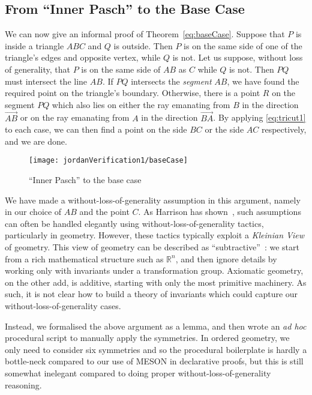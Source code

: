 \subsection{From ``Inner Pasch'' to the Base Case}\label{sec:JordanBaseCase1}
We can now give an informal proof of Theorem~\ref{eq:baseCase}. Suppose that $P$ is inside a triangle $ABC$ and $Q$ is outside. Then $P$ is on the same side of one of the triangle's edges and opposite vertex, while $Q$ is not. Let us suppose, without loss of generality, that $P$ is on the same side of $AB$ as $C$ while $Q$ is not. Then $PQ$ must intersect the line $AB$. If $PQ$ intersects the \emph{segment} $AB$, we have found the required point on the triangle's boundary. Otherwise, there is a point $R$ on the segment $PQ$ which also lies on either the ray emanating from $B$ in the direction $\overrightarrow{AB}$ or on the ray emanating from $A$ in the direction $\overrightarrow{BA}$. By applying \eqref{eq:tricut1} to each case, we can then find a point on the side $BC$ or the side $AC$ respectively, and we are done.

\begin{figure}
\centering\texttt{[image: jordanVerification1/baseCase]}
\caption{``Inner Pasch'' to the base case}
\end{figure}

We have made a without-loss-of-generality assumption in this argument, namely in our choice of $AB$ and the point $C$. As Harrison has shown~\cite{HarrisonWLOG}, such assumptions can often be handled elegantly using without-loss-of-generality tactics, particularly in geometry. However, these tactics typically exploit a \emph{Kleinian View} of geometry. This view of geometry can be described as ``subtractive''~\cite{SubtractiveKlein}: we start from a rich mathematical structure such as $\mathbb{R}^n$, and then ignore details by working only with invariants under a transformation group. Axiomatic geometry, on the other add, is additive, starting with only the most primitive machinery. As such, it is not clear how to build a theory of invariants which could capture our without-loss-of-generality cases.

Instead, we formalised the above argument as a lemma, and then wrote an \emph{ad hoc} procedural script to manually apply the symmetries. In ordered geometry, we only need to consider six symmetries and so the procedural boilerplate is hardly a bottle-neck compared to our use of MESON in declarative proofs, but this is still somewhat inelegant compared to doing proper without-loss-of-generality reasoning.

